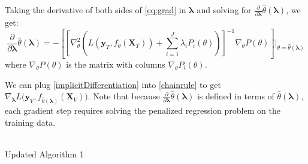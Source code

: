 \documentclass[10pt,letterpaper]{article}
\newcommand*{\vertbar}{\rule[-1ex]{0.5pt}{2.5ex}}
\begin{document}
Taking the derivative of both sides of \eqref{eq:grad} in $\boldsymbol{\lambda}$ and solving for $\frac{\partial}{\partial \boldsymbol{\lambda}} \hat{\theta}(\boldsymbol{\lambda})$, we get:
\begin{equation}
\frac{\partial}{\partial \boldsymbol{\lambda}} \hat{\theta}(\boldsymbol{\lambda}) = 
- \left [ \left [
 \nabla_\theta^2 \left (  L(\boldsymbol{y}_T, f_\theta (\boldsymbol{X}_T))  +  \sum\limits_{i=1}^J \lambda_i P_i(\theta)  \right )  \right ]^{-1}
\nabla_\theta P(\theta)
\right ]
\bigg |_{\theta = \hat \theta(\boldsymbol{\lambda})}
\label{implicitDifferentiation}
\end{equation}
where $\nabla_\theta P(\theta)$ is the matrix with columns $\nabla_\theta P_i(\theta)$.

We can plug \eqref{implicitDifferentiation} into \eqref{chainrule} to get $\nabla_{\boldsymbol{\lambda}} L \Big( \boldsymbol{y}_V, f_{\hat{\theta}(\boldsymbol{\lambda})}(\boldsymbol{X}_V) \Big )$. Note that because $\frac{\partial}{\partial \boldsymbol{\lambda}} \hat{\theta}(\boldsymbol{\lambda})$ is defined in terms of $\hat{\theta}\left(\boldsymbol{\lambda}\right)$, each gradient step requires solving the penalized regression problem on the training data.

\begin{center}
  \\
  Updated Algorithm 1
\end{center}
\end{document}
